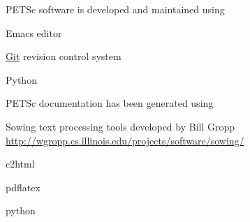PETSc software is developed and maintained using
\begin{tightitemize}
\item Emacs editor
\item \href{http://git-scm.com/}{Git} revision control system
\item Python
\end{tightitemize}

PETSc documentation has been generated using
\begin{tightitemize}
  \item Sowing text processing tools developed by Bill Gropp\\ \href{http://wgropp.cs.illinois.edu/projects/software/sowing/}{http://wgropp.cs.illinois.edu/projects/software/sowing/}
\item c2html
\item pdflatex
\item python
\end{tightitemize}
\
